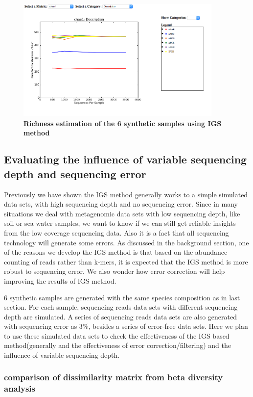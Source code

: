 \begin{figure}[!ht]
 \centerline{\includegraphics[width=4in]{./figures/simple_chao_alpha.png}}
\caption{\bf Richness estimation of the 6 synthetic samples using IGS method}
\label{fig:simple_alpha}
\end{figure}


\subsection{Evaluating the influence of variable sequencing depth and sequencing error}

Previously we have shown the IGS method generally works to a simple simulated data sets, with high sequencing depth and no sequencing error. Since
in many situations we deal with metagenomic data sets with low sequencing depth, like soil or sea water samples, we want to know if we can still 
get reliable insights from the low coverage sequencing data. Also it is a fact that all sequencing technology will generate some errors. As discussed in the background 
section, one of the reasons we develop the IGS method is that based on the abundance counting of reads rather than k-mers, it is expected that the IGS method 
is more robust to sequencing error. We also wonder how error correction will help improving the results of IGS method.

6 synthetic samples are generated with the same species composition as in last section. For each sample, sequencing reads data sets with different
sequencing depth are simulated. A series of sequencing reads data sets are also generated with sequencing error as 3\%, besides a series of error-free data sets.  Here we plan to use these simulated data sets to check the effectiveness of the IGS based method(generally 
and the effectiveness of error correction/filtering) and the influence of variable sequencing depth.

\subsubsection{comparison of dissimilarity matrix from beta diversity analysis}

